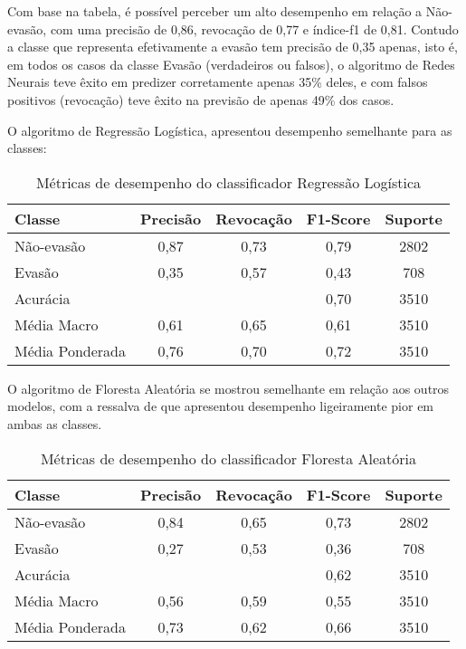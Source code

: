 \documentclass[english, spanish, brazilian]{RBIEarticle} %
\begin{document}
Com base na tabela, é possível perceber um alto desempenho em relação a Não-evasão, com uma precisão de 0,86, revocação de 0,77 e índice-f1 de 0,81. Contudo a classe que representa efetivamente a evasão tem precisão de 0,35 apenas, isto é, em todos os casos da classe Evasão (verdadeiros ou falsos), o algoritmo de Redes Neurais teve êxito em predizer corretamente apenas 35\% deles, e com falsos positivos (revocação) teve êxito na previsão de apenas 49\% dos casos. 

O algoritmo de Regressão Logística, apresentou desempenho semelhante para as classes:

\vspace{0.5cm}
\begin{table}[htbp]
\centering
\label{tab:metricas}
\begin{tabular}{lcccc}
\hline
Classe        & Precisão & Revocação & F1-Score & Suporte \\ \hline
Não-evasão           & 0,87     & 0,73      & 0,79     & 2802    \\
Evasão           & 0,35     & 0,57      & 0,43     & 708     \\ \hline
Acurácia      &          &           & 0,70     & 3510    \\
Média Macro   & 0,61     & 0,65      & 0,61     & 3510    \\
Média Ponderada & 0,76   & 0,70      & 0,72     & 3510    \\ \hline
\end{tabular}
\caption{Métricas de desempenho do classificador Regressão Logística}
\end{table}
\vspace{0.5cm}

O algoritmo de Floresta Aleatória se mostrou semelhante em relação aos outros modelos, com a ressalva de que apresentou desempenho ligeiramente pior em ambas as classes.

\vspace{0.5cm}
\begin{table}[htbp]
\centering
\label{tab:metricas2}
\begin{tabular}{lcccc}
\hline
Classe        & Precisão & Revocação & F1-Score & Suporte \\ \hline
Não-evasão           & 0,84     & 0,65      & 0,73     & 2802    \\
Evasão           & 0,27     & 0,53      & 0,36     & 708     \\ \hline
Acurácia      &          &           & 0,62     & 3510    \\
Média Macro   & 0,56     & 0,59      & 0,55     & 3510    \\
Média Ponderada & 0,73   & 0,62      & 0,66     & 3510    \\ \hline
\end{tabular}
\caption{Métricas de desempenho do classificador Floresta Aleatória}
\end{table}
\vspace{0.5cm}
\end{document}
